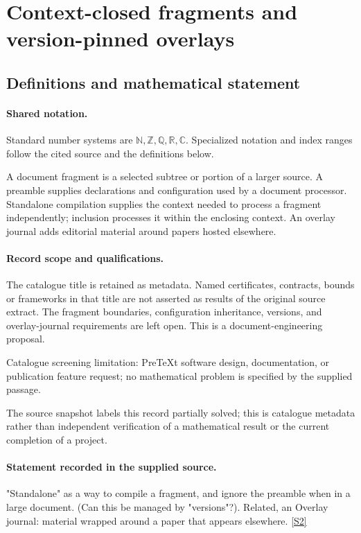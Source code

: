 \documentclass[11pt]{article}
\newcommand{\sref}[2]{\hyperlink{source:#1:#2}{[S#2]}}
\begin{document}
\section{Context-closed fragments and version-pinned overlays}\label{statement}

\subsection{Definitions and mathematical statement}

\paragraph{Shared notation.}Standard number systems are $\mathbb N,\mathbb Z,\mathbb Q,\mathbb R,\mathbb C$. Specialized notation and index ranges follow the cited source and the definitions below.


A document fragment is a selected subtree or portion of a larger source. A preamble supplies declarations and configuration used by a document processor. Standalone compilation supplies the context needed to process a fragment independently; inclusion processes it within the enclosing context. An overlay journal adds editorial material around papers hosted elsewhere.
\paragraph{Record scope and qualifications.}
The catalogue title is retained as metadata. Named certificates, contracts, bounds or frameworks in that title are not asserted as results of the original source extract.
The fragment boundaries, configuration inheritance, versions, and overlay-journal requirements are left open. This is a document-engineering proposal.

Catalogue screening limitation: PreTeXt software design, documentation, or publication feature request; no mathematical problem is specified by the supplied passage.

The source snapshot labels this record partially solved; this is catalogue metadata rather than independent verification of a mathematical result or the current completion of a project.
\paragraph{Statement recorded in the supplied source.}
"Standalone" as a way to compile a fragment, and ignore the preamble when in a large document. (Can this be managed by "versions"?). Related, an Overlay journal: material wrapped around a paper that appears elsewhere. \sref{statement}{2}
\end{document}
